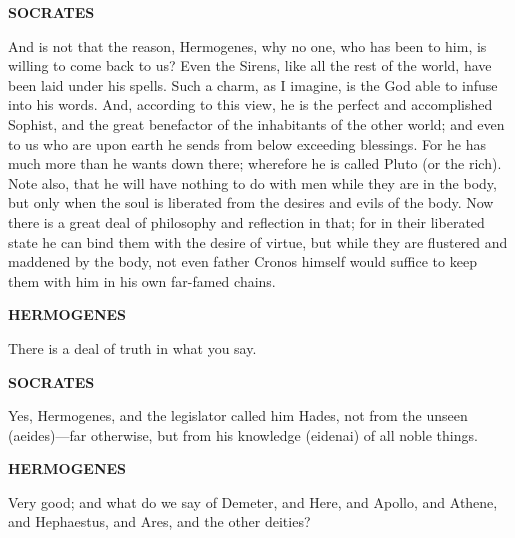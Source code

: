 \documentclass[11pt,letter]{article}
\begin{document}
\par \textbf{SOCRATES}
\par   And is not that the reason, Hermogenes, why no one, who has been to him, is willing to come back to us? Even the Sirens, like all the rest of the world, have been laid under his spells. Such a charm, as I imagine, is the God able to infuse into his words. And, according to this view, he is the perfect and accomplished Sophist, and the great benefactor of the inhabitants of the other world; and even to us who are upon earth he sends from below exceeding blessings. For he has much more than he wants down there; wherefore he is called Pluto (or the rich). Note also, that he will have nothing to do with men while they are in the body, but only when the soul is liberated from the desires and evils of the body. Now there is a great deal of philosophy and reflection in that; for in their liberated state he can bind them with the desire of virtue, but while they are flustered and maddened by the body, not even father Cronos himself would suffice to keep them with him in his own far-famed chains.

\par \textbf{HERMOGENES}
\par   There is a deal of truth in what you say.

\par \textbf{SOCRATES}
\par   Yes, Hermogenes, and the legislator called him Hades, not from the unseen (aeides)—far otherwise, but from his knowledge (eidenai) of all noble things.

\par \textbf{HERMOGENES}
\par   Very good; and what do we say of Demeter, and Here, and Apollo, and Athene, and Hephaestus, and Ares, and the other deities?
\end{document}
